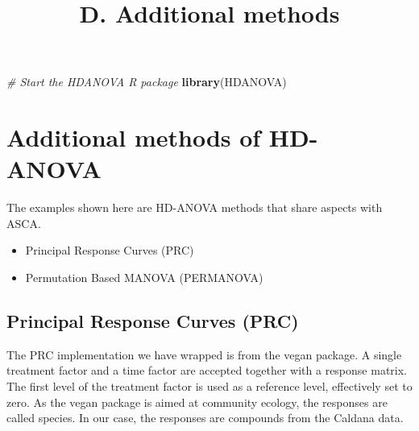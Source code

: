 \documentclass[
]{article}
\title{D. Additional methods}
\author{}
\date{\vspace{-2.5em}}
\newenvironment{Shaded}{\begin{snugshade}}{\end{snugshade}}
\newcommand{\CommentTok}[1]{\textcolor[rgb]{0.56,0.35,0.01}{\textit{#1}}}
\newcommand{\FunctionTok}[1]{\textcolor[rgb]{0.13,0.29,0.53}{\textbf{#1}}}
\newcommand{\NormalTok}[1]{#1}
\providecommand{\tightlist}{%
  \setlength{\itemsep}{0pt}\setlength{\parskip}{0pt}}
\begin{document}
\maketitle

\begin{Shaded}
\begin{Highlighting}[]
\CommentTok{\# Start the HDANOVA R package}
\FunctionTok{library}\NormalTok{(HDANOVA)}
\end{Highlighting}
\end{Shaded}

\section{Additional methods of
HD-ANOVA}\label{additional-methods-of-hd-anova}

The examples shown here are HD-ANOVA methods that share aspects with
ASCA.

\begin{itemize}
\tightlist
\item
  Principal Response Curves (PRC)
\item
  Permutation Based MANOVA (PERMANOVA)
\end{itemize}

\subsection{Principal Response Curves
(PRC)}\label{principal-response-curves-prc}

The PRC implementation we have wrapped is from the vegan package. A
single treatment factor and a time factor are accepted together with a
response matrix. The first level of the treatment factor is used as a
reference level, effectively set to zero. As the vegan package is aimed
at community ecology, the responses are called species. In our case, the
responses are compounds from the Caldana data.
\end{document}
